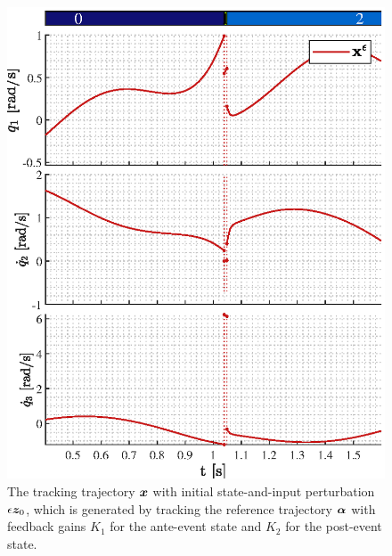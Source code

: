 \documentclass[../DC2019003Bouma.tex]{subfiles}
\begin{document}
\begin{figure}[bt!]
\begin{minipage}[c]{.48\textwidth}
\includegraphics[width=\textwidth]{xevel.eps}
\end{minipage}
\caption{The tracking trajectory ${\boldsymbol{x}}$ with initial state-and-input perturbation $\epsilon{\boldsymbol{z}}_0$, which is generated by tracking the reference trajectory $\boldsymbol{\alpha}$ with feedback gains $K_1$ for the ante-event state and $K_2$ for the post-event state.}\label{fig:5xsim}
\centering
\begin{minipage}[c]{.48\textwidth}
\centering

\end{minipage}
\end{figure}
\end{document}
